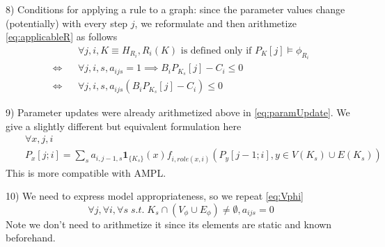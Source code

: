 \documentclass[11pt, oneside, reqno]{article}
\begin{document}
8) Conditions for applying a rule to a graph: since the parameter values change (potentially) with every step $j$, we reformulate and then arithmetize \eqref{eq:applicableR} as follows
\begin{eqnarray}
\label{eq:applicableRArithm}
&& \forall j,i,K \equiv H_{R_i}, R_i(K) \textrm{ is defined only if } P_K[j] \models \phi_{R_i}
\nonumber
\\
\Leftrightarrow && \forall j,i,s, a_{ijs}=1 \implies B_iP_{K_s}[j]-C_i \leq 0 
\nonumber 
\\
\Leftrightarrow && \forall j,i,s, a_{ijs} (B_iP_{K_s}[j]-C_i) \leq 0 
\end{eqnarray}

9) Parameter updates were already arithmetized above in \eqref{eq:paramUpdate}. 
We give a slightly different but equivalent formulation here
\begin{eqnarray}
\label{eq:paramUpdate2}
&& \forall x, j, i
\\
&& P_{x}[j;i] =  \sum_{s}a_{i,j-1,s} \mathbf{1}_{\{K_s\}}(x) f_{i,role(x,i)}(P_y[j-1;i],y \in V(K_s)\cup E(K_s))
\nonumber
\end{eqnarray}
This is more compatible with AMPL.

10) We need to express model appropriateness, so we repeat \eqref{eq:Vphi}
\begin{equation}
\label{eq:VphiArithm}
\forall j, \forall i, \forall s \; s.t. \; K_s \cap (V_\phi \cup E_\phi)\neq \emptyset, a_{ijs}=0
\end{equation}
Note we don't need to arithmetize it since its elements are static and known beforehand.

%
\end{document}
